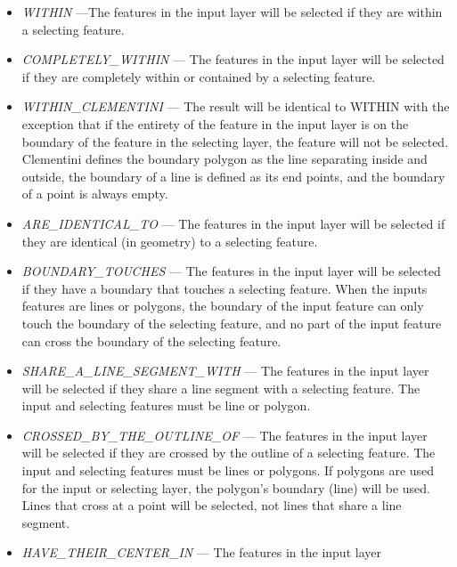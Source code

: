 \documentclass[openany]{book}
\theoremstyle{definition}
\theoremstyle{definition}
\theoremstyle{definition}
\theoremstyle{remark}
\begin{document}
\begin{enumerate}
\begin{itemize}
  \item
    \emph{WITHIN} ---The features in the input layer will be selected if
    they are within a selecting feature.\\
  \item
    \emph{COMPLETELY\_WITHIN} --- The features in the input layer will
    be selected if they are completely within or contained by a
    selecting feature.\\
  \item
    \emph{WITHIN\_CLEMENTINI} --- The result will be identical to WITHIN
    with the exception that if the entirety of the feature in the input
    layer is on the boundary of the feature in the selecting layer, the
    feature will not be selected. Clementini defines the boundary
    polygon as the line separating inside and outside, the boundary of a
    line is defined as its end points, and the boundary of a point is
    always empty.\\
  \item
    \emph{ARE\_IDENTICAL\_TO} --- The features in the input layer will
    be selected if they are identical (in geometry) to a selecting
    feature.\\
  \item
    \emph{BOUNDARY\_TOUCHES} --- The features in the input layer will be
    selected if they have a boundary that touches a selecting feature.
    When the inputs features are lines or polygons, the boundary of the
    input feature can only touch the boundary of the selecting feature,
    and no part of the input feature can cross the boundary of the
    selecting feature.\\
  \item
    \emph{SHARE\_A\_LINE\_SEGMENT\_WITH} --- The features in the input
    layer will be selected if they share a line segment with a selecting
    feature. The input and selecting features must be line or polygon.\\
  \item
    \emph{CROSSED\_BY\_THE\_OUTLINE\_OF} --- The features in the input
    layer will be selected if they are crossed by the outline of a
    selecting feature. The input and selecting features must be lines or
    polygons. If polygons are used for the input or selecting layer, the
    polygon's boundary (line) will be used. Lines that cross at a point
    will be selected, not lines that share a line segment.\\
  \item
    \emph{HAVE\_THEIR\_CENTER\_IN} --- The features in the input layer

\end{itemize}
\end{enumerate}
\end{document}
